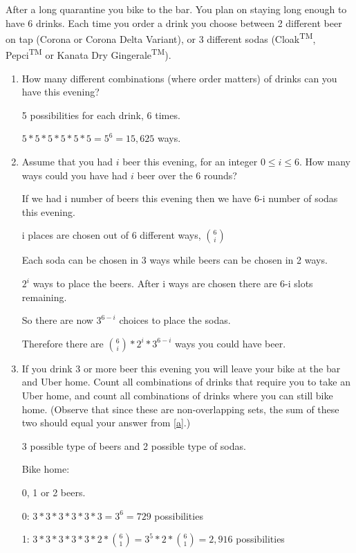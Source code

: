 \documentclass[12pt]{article}
\newcounter{ques}
\newenvironment{question}{\refstepcounter{ques}{\noindent\bf Question \arabic{ques}:}}{\vspace{5mm}}
\begin{document}
\begin{question}
	After a long quarantine you bike to the bar. You plan on staying long enough to have 6 drinks. Each time you order a drink you choose between 2 different beer on tap (Corona or Corona Delta Variant), or 3 different sodas (Cloak\textsuperscript{TM}, Pepci\textsuperscript{TM} or Kanata Dry Gingerale\textsuperscript{TM}).
	
	\begin{enumerate}[label = (\alph*)]
		\item\label{a} How many different combinations (where order matters) of drinks can you have this evening?
		
		5 possibilities for each drink, 6 times.

		$5*5*5*5*5*5 = 5^6 = 15,625$ ways.

		\item\label{b} Assume that you had $i$ beer this evening, for an integer $0\leq i\leq 6$. How many ways could you have had $i$ beer over the $6$ rounds?
		
		If we had i number of beers this evening then we have 6-i number of sodas this evening.

		i places are chosen out of 6 different ways, $6\choose i$

		Each soda can be chosen in 3 ways while beers can be chosen in 2 ways.

		$2^i$ ways to place the beers. After i ways are chosen there are 6-i slots remaining.

		So there are now $3^{6-i}$ choices to place the sodas.

		Therefore there are ${6\choose i} * 2^i * 3^{6-i}$ ways you could have beer.

		\item If you drink 3 or more beer this evening you will leave your bike at the bar and Uber home. Count all combinations of drinks that require you to take an Uber home, and count all combinations of drinks where you can still bike home. (Observe that since these are non-overlapping sets, the sum of these two should equal your answer from \ref{a}.)
		
		3 possible type of beers and 2 possible type of sodas.

		Bike home:

		0, 1 or 2 beers.

		0: $3*3*3*3*3*3 = 3^6 = 729$ possibilities

		1: $3*3*3*3*3*2 * {6\choose1} = 3^5*2* {6\choose1} = 2,916$ possibilities


\end{enumerate}
\end{question}
\end{document}
